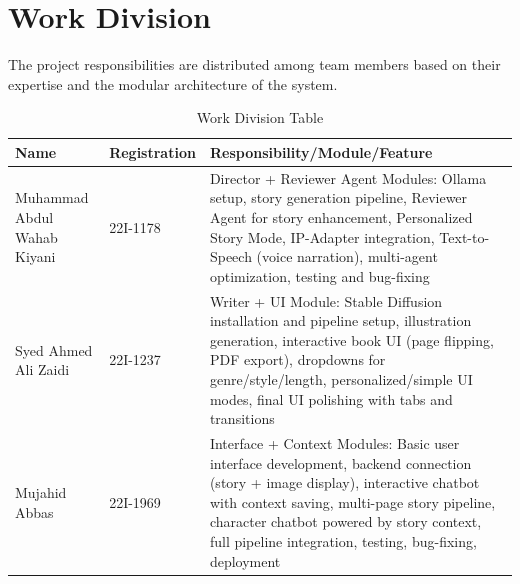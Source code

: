 \section{Work Division}

The project responsibilities are distributed among team members based on their expertise and the modular architecture of the system.

\begin{table}[H]
\centering
\caption{Work Division Table}
\begin{tabular}{|p{4cm}|p{2.5cm}|p{8cm}|}
\hline
\textbf{Name} & \textbf{Registration} & \textbf{Responsibility/Module/Feature} \\ \hline
Muhammad Abdul Wahab Kiyani & 22I-1178 & Director + Reviewer Agent Modules: Ollama setup, story generation pipeline, Reviewer Agent for story enhancement, Personalized Story Mode, IP-Adapter integration, Text-to-Speech (voice narration), multi-agent optimization, testing and bug-fixing \\ \hline
Syed Ahmed Ali Zaidi & 22I-1237 & Writer + UI Module: Stable Diffusion installation and pipeline setup, illustration generation, interactive book UI (page flipping, PDF export), dropdowns for genre/style/length, personalized/simple UI modes, final UI polishing with tabs and transitions \\ \hline
Mujahid Abbas & 22I-1969 & Interface + Context Modules: Basic user interface development, backend connection (story + image display), interactive chatbot with context saving, multi-page story pipeline, character chatbot powered by story context, full pipeline integration, testing, bug-fixing, deployment \\ \hline
\end{tabular}
\label{tab:work_division}
\end{table}

